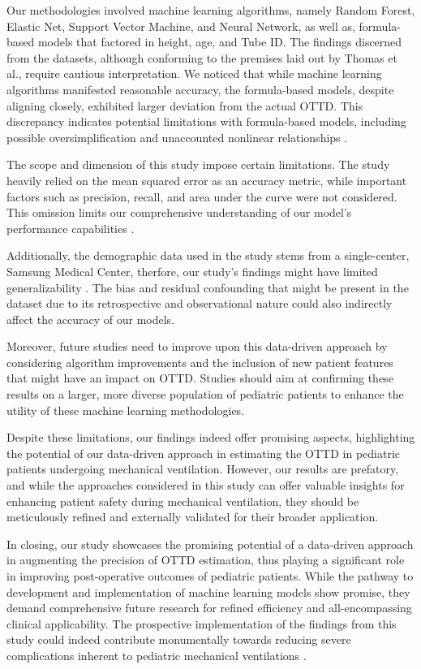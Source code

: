\documentclass[11pt]{article}
\begin{document}
Our methodologies involved machine learning algorithms, namely Random Forest, Elastic Net, Support Vector Machine, and Neural Network, as well as, formula-based models that factored in height, age, and Tube ID. The findings discerned from the datasets, although conforming to the premises laid out by Thomas et al.\cite{Thomas2017ReliabilityOU}, require cautious interpretation. We noticed that while machine learning algorithms manifested reasonable accuracy, the formula-based models, despite aligning closely, exhibited larger deviation from the actual OTTD. This discrepancy indicates potential limitations with formula-based models, including possible oversimplification and unaccounted nonlinear relationships \cite{Lauguico2020ACA, Sher2022PilotSO}.

The scope and dimension of this study impose certain limitations. The study heavily relied on the mean squared error as an accuracy metric, while important factors such as precision, recall, and area under the curve were not considered. This omission limits our comprehensive understanding of our model's performance capabilities \cite{Sher2022PilotSO}.

Additionally, the demographic data used in the study stems from a single-center, Samsung Medical Center, therfore, our study's findings might have limited generalizability \cite{Fleming2019ClinicalAS}. The bias and residual confounding that might be present in the dataset due to its retrospective and observational nature could also indirectly affect the accuracy of our models.

Moreover, future studies need to improve upon this data-driven approach by considering algorithm improvements and the inclusion of new patient features that might have an impact on OTTD. Studies should aim at confirming these results on a larger, more diverse population of pediatric patients to enhance the utility of these machine learning methodologies. 

Despite these limitations, our findings indeed offer promising aspects, highlighting the potential of our data-driven approach in estimating the OTTD in pediatric patients undergoing mechanical ventilation. However, our results are prefatory, and while the approaches considered in this study can offer valuable insights for enhancing patient safety during mechanical ventilation, they should be meticulously refined and externally validated for their broader application. 

In closing, our study showcases the promising potential of a data-driven approach in augmenting the precision of OTTD estimation, thus playing a significant role in improving post-operative outcomes of pediatric patients. While the pathway to development and implementation of machine learning models show promise, they demand comprehensive future research for refined efficiency and all-encompassing clinical applicability. The prospective implementation of the findings from this study could indeed contribute monumentally towards reducing severe complications inherent to pediatric mechanical ventilations \cite{Lauguico2020ACA}.
\end{document}
